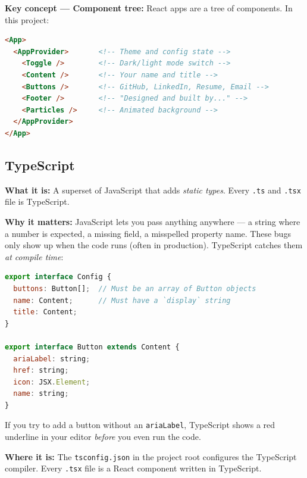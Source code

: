 \documentclass[11pt, letterpaper]{article}
\begin{document}
\textbf{Key concept --- Component tree:} React apps are a tree of components.
In this project:

\begin{lstlisting}[style=code, language=HTML, caption={Component hierarchy}]
<App>
  <AppProvider>       <!-- Theme and config state -->
    <Toggle />        <!-- Dark/light mode switch -->
    <Content />       <!-- Your name and title -->
    <Buttons />       <!-- GitHub, LinkedIn, Resume, Email -->
    <Footer />        <!-- "Designed and built by..." -->
    <Particles />     <!-- Animated background -->
  </AppProvider>
</App>
\end{lstlisting}

\subsection{TypeScript}

\textbf{What it is:} A superset of JavaScript that adds \textit{static types}.
Every \texttt{.ts} and \texttt{.tsx} file is TypeScript.

\textbf{Why it matters:} JavaScript lets you pass anything anywhere --- a
string where a number is expected, a missing field, a misspelled property name.
These bugs only show up when the code runs (often in production). TypeScript
catches them \textit{at compile time}:

\begin{lstlisting}[style=code, language=JavaScript, caption={src/types/config.interface.ts --- Type safety}]
export interface Config {
  buttons: Button[];  // Must be an array of Button objects
  name: Content;      // Must have a `display` string
  title: Content;
}

export interface Button extends Content {
  ariaLabel: string;
  href: string;
  icon: JSX.Element;
  name: string;
}
\end{lstlisting}

If you try to add a button without an \texttt{ariaLabel}, TypeScript shows a
red underline in your editor \textit{before} you even run the code.

\textbf{Where it is:} The \texttt{tsconfig.json} in the project root
configures the TypeScript compiler. Every \texttt{.tsx} file is a React
component written in TypeScript.

\end{document}
